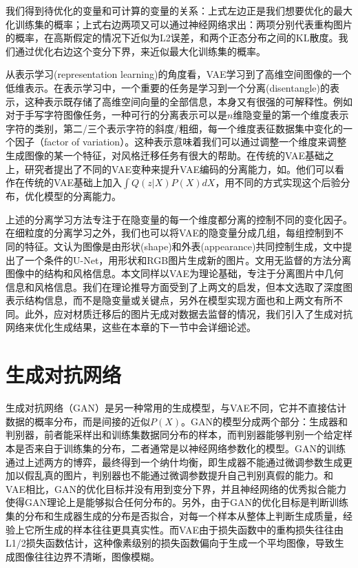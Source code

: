 \documentclass[UTF8,openany,AutoFakeBold,AutoFakeSlant,cs4size]{ctexbook}
\begin{document}
我们得到待优化的变量和可计算的变量的关系：上式左边正是我们想要优化的最大化训练集的概率；上式右边两项又可以通过神经网络求出：两项分别代表重构图片的概率，在高斯假定的情况下近似为L2误差，和两个正态分布之间的KL散度。我们通过优化右边这个变分下界，来近似最大化训练集的概率。

从表示学习(representation learning)的角度看，VAE学习到了高维空间图像的一个低维表示。在表示学习中，一个重要的任务是学习到一个分离(disentangle)的表示，这种表示既存储了高维空间向量的全部信息，本身又有很强的可解释性。例如对于手写字符图像任务，一种可行的分离表示可以是$n$维隐变量的第一个维度表示字符的类别，第二/三个表示字符的斜度/粗细，每一个维度表征数据集中变化的一个因子（factor of variation）。这种表示意味着我们可以通过调整一个维度来调整生成图像的某一个特征，对风格迁移任务有很大的帮助。在传统的VAE基础之上，研究者提出了不同的VAE变种来提升VAE编码的分离能力，如\cite{Burgess2018UnderstandingDI, RubSchTol18b}。他们可以看作在传统的VAE基础上加入$\int Q(z|X) P(X) dX$，用不同的方式实现这个后验分布，优化模型的分离能力。

上述的分离学习方法专注于在隐变量的每一个维度都分离的控制不同的变化因子。在细粒度的分离学习之外，我们也可以将VAE的隐变量分成几组，每组控制到不同的特征。\cite{vunet2018}文认为图像是由形状(shape)和外表(appearance)共同控制生成，文中提出了一个条件的U-Net，用形状和RGB图片生成新的图片。\cite{Wu2019DisentanglingCA}文用无监督的方法分离图像中的结构和风格信息。本文同样以VAE为理论基础，专注于分离图片中几何信息和风格信息。我们在理论推导方面受到了上两文的启发，但本文选取了深度图表示结构信息，而不是隐变量\cite{vunet2018}或关键点\cite{Wu2019DisentanglingCA}，另外在模型实现方面也和上两文有所不同。此外，应对材质迁移后的图片无成对数据去监督的情况，我们引入了生成对抗网络来优化生成结果，这些在本章的下一节中会详细论述。

\section{生成对抗网络}

生成对抗网络（GAN）\cite{NIPS2014_5423}是另一种常用的生成模型，与VAE不同，它并不直接估计数据的概率分布，而是间接的近似$P(X)$。GAN的模型分成两个部分：生成器和判别器，前者能采样出和训练集数据同分布的样本，而判别器能够判别一个给定样本是否来自于训练集的分布，二者通常是以神经网络参数化的模型。GAN的训练通过上述两方的博弈，最终得到一个纳什均衡，即生成器不能通过微调参数生成更加以假乱真的图片，判别器也不能通过微调参数提升自己判别真假的能力。和VAE相比，GAN的优化目标并没有用到变分下界，并且神经网络的优秀拟合能力使得GAN理论上是能够拟合任何分布的。另外，由于GAN的优化目标是判断训练集的分布和生成器生成的分布是否拟合，对每一个样本从整体上判断生成质量，经验上它所生成的样本往往更具真实性。而VAE由于损失函数中的重构损失往往由L1/2损失函数估计，这种像素级别的损失函数偏向于生成一个平均图像，导致生成图像往往边界不清晰，图像模糊。
\end{document}
